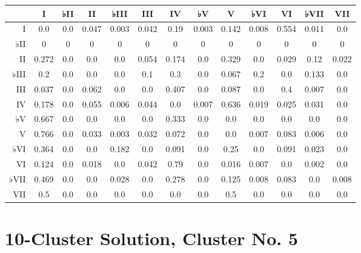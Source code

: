 \begin{table}[htbp]
\begin{minipage}{\linewidth}
\setlength{\tymax}{0.5\linewidth}
\centering
\small
\begin{tabulary}{\textwidth}{@{}RCCCCCCCCCCCC@{}} \toprule
&I&♭II&II&♭III&III&IV&♭V&V&♭VI&VI&♭VII&VII\\
\midrule
I&0.0&0.0&0.047&0.003&0.042&0.19&0.003&0.142&0.008&0.554&0.011&0.0\\
♭II&0&0&0&0&0&0&0&0&0&0&0&0\\
II&0.272&0.0&0.0&0.0&0.054&0.174&0.0&0.329&0.0&0.029&0.12&0.022\\
♭III&0.2&0.0&0.0&0.0&0.1&0.3&0.0&0.067&0.2&0.0&0.133&0.0\\
III&0.037&0.0&0.062&0.0&0.0&0.407&0.0&0.087&0.0&0.4&0.007&0.0\\
IV&0.178&0.0&0.055&0.006&0.044&0.0&0.007&0.636&0.019&0.025&0.031&0.0\\
♭V&0.667&0.0&0.0&0.0&0.0&0.333&0.0&0.0&0.0&0.0&0.0&0.0\\
V&0.766&0.0&0.033&0.003&0.032&0.072&0.0&0.0&0.007&0.083&0.006&0.0\\
♭VI&0.364&0.0&0.0&0.182&0.0&0.091&0.0&0.25&0.0&0.091&0.023&0.0\\
VI&0.124&0.0&0.018&0.0&0.042&0.79&0.0&0.016&0.007&0.0&0.002&0.0\\
♭VII&0.469&0.0&0.0&0.028&0.0&0.278&0.0&0.125&0.008&0.083&0.0&0.008\\
VII&0.5&0.0&0.0&0.0&0.0&0.0&0.0&0.5&0.0&0.0&0.0&0.0\\

\bottomrule

\end{tabulary}
\end{minipage}
\end{table}

\section{10-Cluster Solution, Cluster No. 5}
\label{10-clustersolutionclusterno.5}

